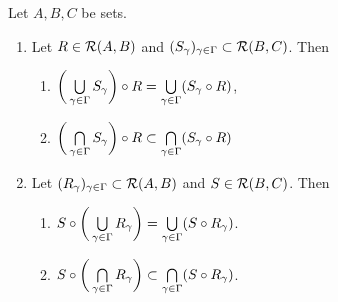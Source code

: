 \begin{ex}
	Let $A, B, C$ be sets. 
	\begin{enumerate}
		\item Let $R \in \mathcal{R}(A, B)$ and $(S_{\gamma})_{\gamma \in \Gamma} \subset \mathcal{R}(B, C)$. Then
		\begin{enumerate}
			\item $\bigg( \bigcup\limits_{\gamma \in \Gamma} S_{\gamma} \bigg) \circ R = \bigcup\limits_{\gamma \in \Gamma} (S_{\gamma} \circ R)$,
			\item $\bigg( \bigcap\limits_{\gamma \in \Gamma} S_{\gamma} \bigg) \circ R \subset \bigcap\limits_{\gamma \in \Gamma} (S_{\gamma} \circ R)$
		\end{enumerate} 
		\item Let $(R_{\gamma})_{\gamma \in \Gamma} \subset \mathcal{R}(A, B)$ and $S \in \mathcal{R}(B, C)$. Then
		\begin{enumerate}
			\item $S \circ \bigg( \bigcup\limits_{\gamma \in \Gamma} R_{\gamma} \bigg) = \bigcup\limits_{\gamma \in \Gamma} (S \circ R_{\gamma} )$.
			\item $S \circ \bigg( \bigcap\limits_{\gamma \in \Gamma} R_{\gamma} \bigg) \subset \bigcap\limits_{\gamma \in \Gamma} (S \circ R_{\gamma} )$.
		\end{enumerate} 
	\end{enumerate}
\end{ex}

